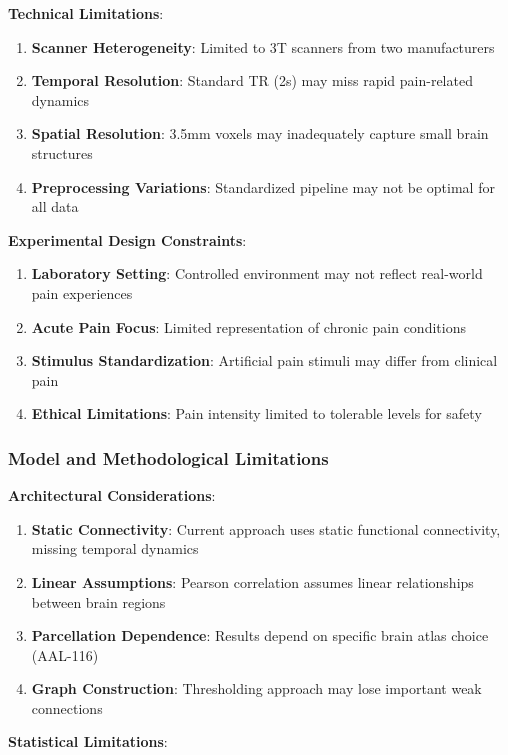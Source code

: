 \documentclass[10pt,journal,compsoc]{IEEEtran}
\begin{document}
\textbf{Technical Limitations}:

\begin{enumerate}
\item \textbf{Scanner Heterogeneity}: Limited to 3T scanners from two manufacturers
\item \textbf{Temporal Resolution}: Standard TR (2s) may miss rapid pain-related dynamics
\item \textbf{Spatial Resolution}: 3.5mm voxels may inadequately capture small brain structures
\item \textbf{Preprocessing Variations}: Standardized pipeline may not be optimal for all data
\end{enumerate}

\textbf{Experimental Design Constraints}:

\begin{enumerate}
\item \textbf{Laboratory Setting}: Controlled environment may not reflect real-world pain experiences
\item \textbf{Acute Pain Focus}: Limited representation of chronic pain conditions
\item \textbf{Stimulus Standardization}: Artificial pain stimuli may differ from clinical pain
\item \textbf{Ethical Limitations}: Pain intensity limited to tolerable levels for safety
\end{enumerate}

\subsubsection{Model and Methodological Limitations}

\textbf{Architectural Considerations}:

\begin{enumerate}
\item \textbf{Static Connectivity}: Current approach uses static functional connectivity, missing temporal dynamics
\item \textbf{Linear Assumptions}: Pearson correlation assumes linear relationships between brain regions
\item \textbf{Parcellation Dependence}: Results depend on specific brain atlas choice (AAL-116)
\item \textbf{Graph Construction}: Thresholding approach may lose important weak connections
\end{enumerate}

\textbf{Statistical Limitations}:
\end{document}
